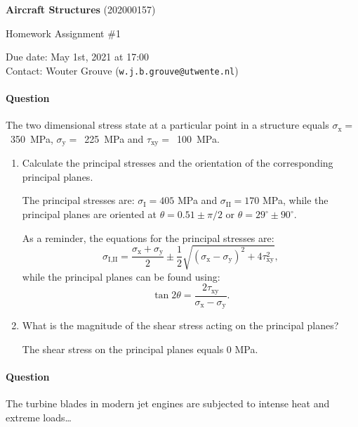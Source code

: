 \documentclass[a4paper,12pt,fleqn]{article}
\makeatletter
\newcounter{question}
\newcommand*\question{%
  \stepcounter{question}%
  \paragraph{Question \thequestion}}
\newcommand{\coursename}{Aircraft Structures}
\newcommand{\coursecode}{202000157}
\newcommand{\assigntype}{Homework Assignment \#1}
\newcommand{\duedate}{May 1st, 2021 at 17:00}
\newcommand{\teacher}{Wouter Grouve (\texttt{w.j.b.grouve@utwente.nl})}
\makeatother
\begin{document}
%
%

\noindent\makebox[\linewidth]{\rule{\textwidth}{0.4pt}}

\begin{center}
  \Large \textbf{\coursename} (\coursecode)
\end{center}

\begin{center}
  \large \assigntype{} \\
  \vspace{3mm}
\end{center}

\begin{center}
  Due date: \duedate\\
  Contact: \teacher
\end{center}

\noindent\makebox[\linewidth]{\rule{\textwidth}{0.4pt}}


%
%

\question The two dimensional stress state at a particular point in a
structure equals \mbox{$\sigma_{\text{x}} =$ 350 MPa},
\mbox{$\sigma_{\text{y}} =$ 225 MPa} and \mbox{$\tau_{\text{xy}} =$
  100 MPa}.
\begin{enumerate}
\item{} Calculate the principal stresses and the orientation of the
  corresponding principal planes.
  \begin{answer}
    The principal stresses are: $\sigma_{\textrm{I}} = 405$ MPa and
    $\sigma_{\textrm{II}} = 170$ MPa, while the principal planes are
    oriented at $\theta = 0.51 \pm \pi/2$ or
    $\theta = 29^{\circ} \pm 90^{\circ}$.

    As a reminder, the equations for the principal stresses are:
    \begin{equation*}
      \sigma_{\textrm{I,II}} = \frac{\sigma_{\textrm{x}} + \sigma_{\textrm{y}}}{2} \pm
      \frac{1}{2}\sqrt{(\sigma_{\textrm{x}} - \sigma_{\textrm{y}})^2 + 4\tau^2_{\textrm{xy}}},
    \end{equation*}
    while the principal planes can be found using:
    \begin{equation*}
      \tan 2\theta = \frac{2\tau_{\textrm{xy}}}{\sigma_{\textrm{x}} - \sigma_{\textrm{y}}}.
    \end{equation*}
  \end{answer}
\item{} What is the magnitude of the shear stress acting on the
  principal planes?
  \begin{answer}
    The shear stress on the principal planes equals 0 MPa.
  \end{answer}
\end{enumerate}

\question The turbine blades in modern jet engines are subjected to
intense heat and extreme loads\ldots

\label{finalpage}
\end{document}
